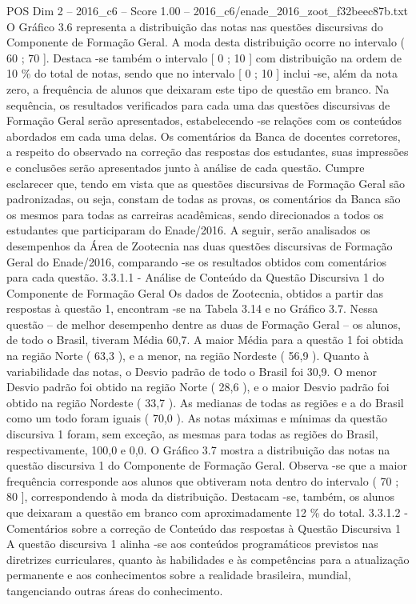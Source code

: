 \begin{textsample}{POS Dim 2 – 2016\_c6 – Score 1.00 – 2016\_c6/enade\_2016\_zoot\_f32beec87b.txt}
O Gráfico 3.6 representa a distribuição das notas nas questões discursivas do Componente de Formação Geral.
A moda desta distribuição ocorre no intervalo ( 60 ; 70 ].
Destaca -se também o intervalo [ 0 ; 10 ] com distribuição na ordem de 10 \% do total de notas, sendo que no intervalo [ 0 ; 10 ] inclui -se, além da nota zero, a frequência de alunos que deixaram este tipo de questão em branco.
Na sequência, os resultados verificados para cada uma das questões discursivas de Formação Geral serão apresentados, estabelecendo -se relações com os conteúdos abordados em cada uma delas.
Os comentários da Banca de docentes corretores, a respeito do observado na correção das respostas dos estudantes, suas impressões e conclusões serão apresentados junto à análise de cada questão.
Cumpre esclarecer que, tendo em vista que as questões discursivas de Formação Geral são padronizadas, ou seja, constam de todas as provas, os comentários da Banca são os mesmos para todas as carreiras acadêmicas, sendo direcionados a todos os estudantes que participaram do Enade/2016.
A seguir, serão analisados os desempenhos da Área de Zootecnia nas duas questões discursivas de Formação Geral do Enade/2016, comparando -se os resultados obtidos com comentários para cada questão. 3.3.1.1 - Análise de Conteúdo da Questão Discursiva 1 do Componente de Formação Geral Os dados de Zootecnia, obtidos a partir das respostas à questão 1, encontram -se na Tabela 3.14 e no Gráfico 3.7.
Nessa questão – de melhor desempenho dentre as duas de Formação Geral – os alunos, de todo o Brasil, tiveram Média 60,7.
A maior Média para a questão 1 foi obtida na região Norte ( 63,3 ), e a menor, na região Nordeste ( 56,9 ).
Quanto à variabilidade das notas, o Desvio padrão de todo o Brasil foi 30,9.
O menor Desvio padrão foi obtido na região Norte ( 28,6 ), e o maior Desvio padrão foi obtido na região Nordeste ( 33,7 ).
As medianas de todas as regiões e a do Brasil como um todo foram iguais ( 70,0 ).
As notas máximas e mínimas da questão discursiva 1 foram, sem exceção, as mesmas para todas as regiões do Brasil, respectivamente, 100,0 e 0,0.
O Gráfico 3.7 mostra a distribuição das notas na questão discursiva 1 do Componente de Formação Geral.
Observa -se que a maior frequência corresponde aos alunos que obtiveram nota dentro do intervalo ( 70 ; 80 ], correspondendo à moda da distribuição.
Destacam -se, também, os alunos que deixaram a questão em branco com aproximadamente 12 \% do total. 3.3.1.2 - Comentários sobre a correção de Conteúdo das respostas à Questão Discursiva 1 A questão discursiva 1 alinha -se aos conteúdos programáticos previstos nas diretrizes curriculares, quanto às habilidades e às competências para a atualização permanente e aos conhecimentos sobre a realidade brasileira, mundial, tangenciando outras áreas do conhecimento.

\end{textsample}
